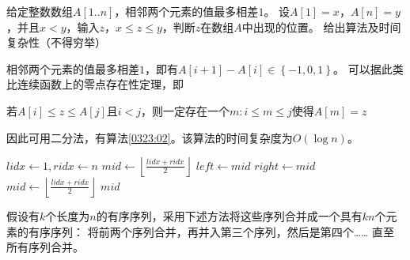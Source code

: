 \begin{questions}
    \question 给定整数数组$A[1..n]$，相邻两个元素的值最多相差$1$。
    设$A[1]=x$，$A[n]=y$，并且$x<y$，输入$z$，$x \leq z \leq y$，判断$z$在数组$A$中出现的位置。
    给出算法及时间复杂性（不得穷举）

    \begin{solution}
        相邻两个元素的值最多相差$1$，即有$A[i+1] - A[i] \in \left\{-1, 0, 1\right\}$。
        可以据此类比连续函数上的零点存在性定理，即

        \begin{center}
            若$A[i] \leq z \leq A[j]$且$i < j$，则一定存在一个$m : i \leq m \leq j$使得$A[m] = z$
        \end{center}

        因此可用二分法，有算法\ref{0323:02}。该算法的时间复杂度为$O(\log n)$。
    \end{solution}

    \begin{algorithm}[!htp]
        \caption{\quad}\label{0323:02}
        \begin{algorithmic}[1]
            \State $lidx \gets 1, ridx \gets n$
            \State $mid \gets \left\lfloor \frac{lidx+ridx}{2} \right\rfloor$
            \State $left \gets mid$ 
            \Else {}
            \State $right \gets mid$ 
            \EndIf
            \State $mid \gets \left\lfloor \frac{lidx+ridx}{2} \right\rfloor$
            \EndWhile
            \State \Return $mid$
        \end{algorithmic}
    \end{algorithm}

    \question 假设有$k$个长度为$n$的有序序列，采用下述方法将这些序列合并成一个具有$kn$个元素的有序序列：
    将前两个序列合并，再并入第三个序列，然后是第四个……
    直至所有序列合并。
    \begin{parts}

\end{parts}
\end{questions}

